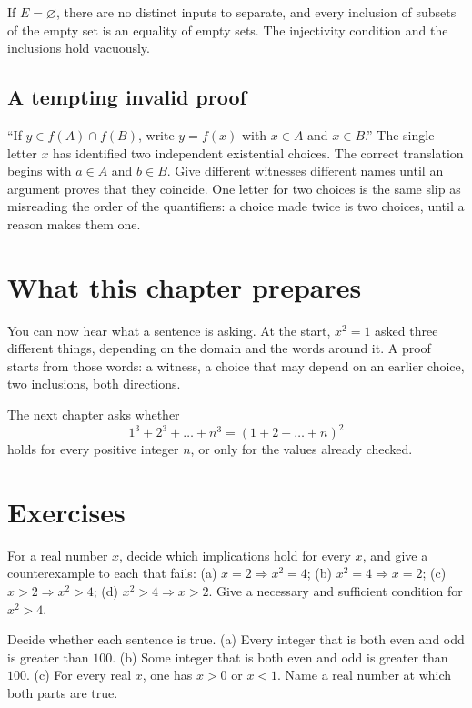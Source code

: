If $E=\varnothing$, there are no distinct inputs to separate, and every inclusion of subsets of the empty set is an equality of empty sets. The injectivity condition and the inclusions hold vacuously.

\subsection*{A tempting invalid proof}

``If $y\in f(A)\cap f(B)$, write $y=f(x)$ with $x\in A$ and $x\in B$.'' The single letter $x$ has identified two independent existential choices. The correct translation begins with $a\in A$ and $b\in B$. Give different witnesses different names until an argument proves that they coincide. One letter for two choices is the same slip as misreading the order of the quantifiers: a choice made twice is two choices, until a reason makes them one.

\section*{What this chapter prepares}
You can now hear what a sentence is asking. At the start, $x^2=1$ asked three different things, depending on the domain and the words around it. A proof starts from those words: a witness, a choice that may depend on an earlier choice, two inclusions, both directions.

The next chapter asks whether
\[
1^3+2^3+\dots+n^3=(1+2+\dots+n)^2
\]
holds for every positive integer $n$, or only for the values already checked.

\section{Exercises}

\begin{exercise}[$\star$]\label{ex:lang-implications}
For a real number $x$, decide which implications hold for every $x$, and give a counterexample to each that fails:
(a) $x=2\Rightarrow x^2=4$;
(b) $x^2=4\Rightarrow x=2$;
(c) $x>2\Rightarrow x^2>4$;
(d) $x^2>4\Rightarrow x>2$.
Give a necessary and sufficient condition for $x^2>4$.
\end{exercise}

\begin{exercise}[$\star$]\label{ex:lang-vacuous}
Decide whether each sentence is true.
(a) Every integer that is both even and odd is greater than $100$.
(b) Some integer that is both even and odd is greater than $100$.
(c) For every real $x$, one has $x>0$ or $x<1$. Name a real number at which both parts are true.
\end{exercise}

